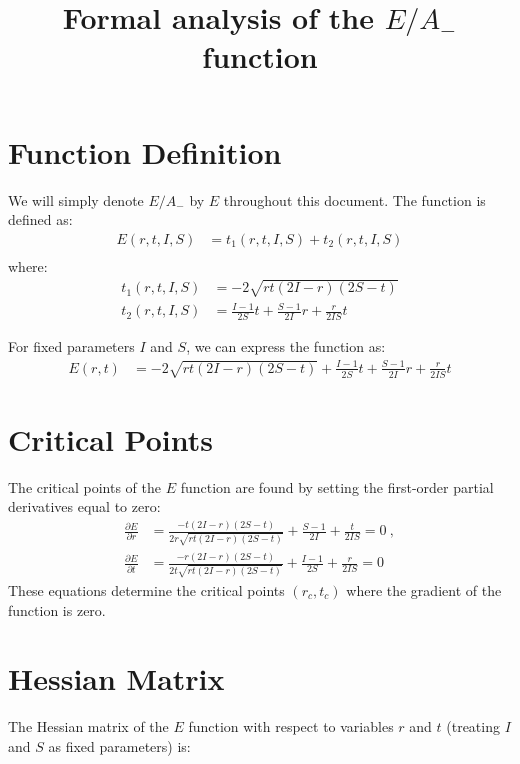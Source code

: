 \documentclass[a4paper]{article}
\title{Formal analysis of the $E/A_{-}$ function}
\author{}
\date{}
\begin{document}
\maketitle

\section{Function Definition}

We will simply denote $E/A_{-}$ by $E$ throughout this document. The function is defined as:
\begin{align}
E(r,t,I,S) &= t_1(r,t,I,S) + t_2(r,t,I,S)\\
\end{align}
where:
\begin{align}
t_1(r,t,I,S) &= -2\sqrt{rt(2I-r)(2S-t)}\\
t_2(r,t,I,S) &= \frac{I-1}{2S}t + \frac{S-1}{2I}r + \frac{r}{2IS}t
\label{terms}
\end{align}

For fixed parameters $I$ and $S$, we can express the function as:
\begin{align}
E(r,t) &= -2\sqrt{rt(2I-r)(2S-t)} + \frac{I-1}{2S}t + \frac{S-1}{2I}r + \frac{r}{2IS}t
\end{align}

\section{Critical Points}
The critical points of the $E$ function are found by setting the first-order partial derivatives equal to zero:
\begin{align}
\frac{\partial E}{\partial r} &= \frac{-t(2I-r)(2S-t)}{2r\sqrt{rt(2I-r)(2S-t)}} + \frac{S-1}{2I} + \frac{t}{2IS} = 0\ ,\\
\frac{\partial E}{\partial t} &= \frac{-r(2I-r)(2S-t)}{2t\sqrt{rt(2I-r)(2S-t)}} + \frac{I-1}{2S} + \frac{r}{2IS} = 0
\end{align}
These equations determine the critical points $(r_c, t_c)$ where the gradient of the function is zero.

\section{Hessian Matrix}

The Hessian matrix of the $E$ function with respect to variables $r$ and $t$ (treating $I$ and $S$ as fixed parameters) is:
\end{document}
